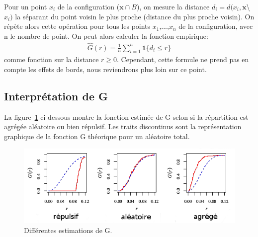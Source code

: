 \documentclass[stage2a]{tnreport}
\begin{document}
Pour un point \begin{math}x_i\end{math} de la configuration (\begin{math}\textbf{x} \cap B\end{math}), on mesure la distance \begin{math}d_i = d(x_i,\textbf{x}\end{math}\textbackslash\begin{math} x_i)\end{math} la séparant du point voisin le plus proche (distance du plus proche voisin). On répète alors cette opération pour tous les points \begin{math}x_1\end{math},...,\begin{math}x_n\end{math} de la configuration, avec n le nombre de point. On peut alors calculer la fonction empirique:
\begin{align*} \hat{G}(r) = \frac{1}{n}\sum_{i=1}^n \mathds{1} \{d_i \leq r \}\end{align*}
comme fonction sur la distance \begin{math} r \geq 0 \end{math}. Cependant, cette formule ne prend pas en compte les effets de bords, nous reviendrons plus loin sur ce point.


\subsection{Interprétation de G }
La figure~\ref{fig:interpretG} ci-dessous montre la fonction estimée de G selon si la répartition est agrégée aléatoire ou bien répulsif. Les traits discontinus sont la représentation graphique de la fonction G théorique pour un aléatoire total.\\

\begin{figure}[h]
  \centering
  \includegraphics[scale=0.7]{figures/interpretG2.png}
  \caption{Différentes estimations de G.}
  \label{fig:interpretG}
\end{figure}
\end{document}
